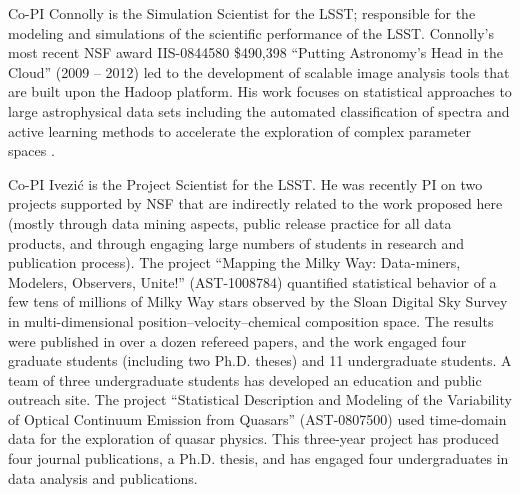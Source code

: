 Co-PI Connolly is the Simulation Scientist for the LSST; responsible
for the modeling and simulations of the scientific performance of the
LSST. Connolly's most recent NSF award IIS-0844580 \$490,398 ``Putting
Astronomy's Head in the Cloud'' (2009 -- 2012) led to the development
of scalable image analysis tools that are built upon the Hadoop
platform\citep{wiley2011}. His work focuses on statistical approaches
to large astrophysical data sets including the automated
classification of spectra \cite{vdp2009,daniel2011} and active
learning methods to accelerate the exploration of complex parameter
spaces \cite{daniel2012}.

Co-PI Ivezi\'{c} is the Project Scientist for the LSST. He was
recently PI on two projects supported by NSF that are indirectly
related to the work proposed here (mostly through data mining aspects,
public release practice for all data products, and through engaging
large numbers of students in research and publication process).  The
project ``Mapping the Milky Way: Data-miners, Modelers, Observers,
Unite!'' (AST-1008784) quantified statistical behavior of a few tens
of millions of Milky Way stars observed by the Sloan Digital Sky
Survey in multi-dimensional position--velocity--chemical composition
space. The results were published in over a dozen refereed papers, and
the work engaged four graduate students (including two Ph.D. theses)
and 11 undergraduate students.  A team of three undergraduate students
has developed an education and public outreach site.
The project ``Statistical Description and Modeling of the Variability
of Optical Continuum Emission from Quasars'' (AST-0807500) used
time-domain data for the exploration of quasar physics. This
three-year project has produced four journal publications, a
Ph.D. thesis, and has engaged four undergraduates in data analysis and
publications.

